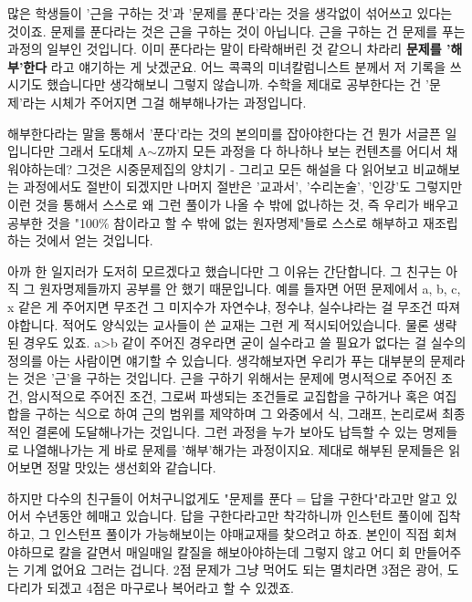 많은 학생들이 '근을 구하는 것'과 '문제를 푼다'라는 것을 생각없이 섞어쓰고 있다는 것이죠.
문제를 푼다라는 것은 근을 구하는 것이 아닙니다. 근을 구하는 건 문제를 푸는 과정의 일부인 것입니다.
이미 푼다라는 말이 타락해버린 것 같으니 차라리
\textbf{문제를 '해부'한다}
라고 얘기하는 게 낫겠군요.
어느 콕콕의 미녀칼럼니스트 분께서 저 기록을 쓰시기도 했습니다만
생각해보니 그렇지 않습니까. 수학을 제대로 공부한다는 건 '문제'라는 시체가 주어지면 그걸 해부해나가는 과정입니다.
\vspace{5mm}

해부한다라는 말을 통해서 '푼다'라는 것의 본의미를 잡아야한다는 건 뭔가 서글픈 일입니다만
그래서 도대체 A$\sim$Z까지 모든 과정을 다 하나하나 보는 컨텐츠를 어디서 채워야하는데?
그것은 시중문제집의 양치기 - 그리고 모든 해설을 다 읽어보고 비교해보는 과정에서도 절반이 되겠지만
나머지 절반은 '교과서', '수리논술', '인강'도 그렇지만 이런 것을 통해서 스스로 왜 그런 풀이가 나올 수 밖에 없나하는 것,
즉 우리가 배우고 공부한 것을 "100$\%$ 참이라고 할 수 밖에 없는 원자명제"들로 스스로 해부하고 재조립하는 것에서 얻는 것입니다.
\vspace{5mm}

아까 한 일지러가 도저히 모르겠다고 했습니다만 그 이유는 간단합니다. 그 친구는 아직 그 원자명제들까지 공부를 안 했기 때문입니다.
예를 들자면 어떤 문제에서 a, b, c, x 같은 게 주어지면 무조건 그 미지수가 자연수냐, 정수냐, 실수냐라는 걸 무조건 따져야합니다.
적어도 양식있는 교사들이 쓴 교재는 그런 게 적시되어있습니다.
물론 생략된 경우도 있죠. a>b 같이 주어진 경우라면 굳이 실수라고 쓸 필요가 없다는 걸 실수의 정의를 아는 사람이면 얘기할 수 있습니다.
생각해보자면 우리가 푸는 대부분의 문제라는 것은 '근'을 구하는 것입니다.
근을 구하기 위해서는 문제에 명시적으로 주어진 조건, 암시적으로 주어진 조건, 그로써 파생되는 조건들로
교집합을 구하거나 혹은 여집합을 구하는 식으로 하여 근의 범위를 제약하며
그 와중에서 식, 그래프, 논리로써 최종적인 결론에 도달해나가는 것입니다.
그런 과정을 누가 보아도 납득할 수 있는 명제들로 나열해나가는 게 바로 문제를 '해부'해가는 과정이지요.
제대로 해부된 문제들은 읽어보면 정말 맛있는 생선회와 같습니다.
\vspace{5mm}

하지만 다수의 친구들이 어처구니없게도 "문제를 푼다 = 답을 구한다"라고만 알고 있어서 수년동안 헤매고 있습니다.
답을 구한다라고만 착각하니까 인스턴트 풀이에 집착하고, 그 인스턴프 풀이가 가능해보이는 야매교재를 찾으려고 하죠.
본인이 직접 회쳐야하므로 칼을 갈면서 매일매일 칼질을 해보아야하는데 그렇지 않고 어디 회 만들어주는 기계 없어요 그러는 겁니다.
2점 문제가 그냥 먹어도 되는 멸치라면 3점은 광어, 도다리가 되겠고 4점은 마구로나 복어라고 할 수 있겠죠.
\vspace{5mm}

